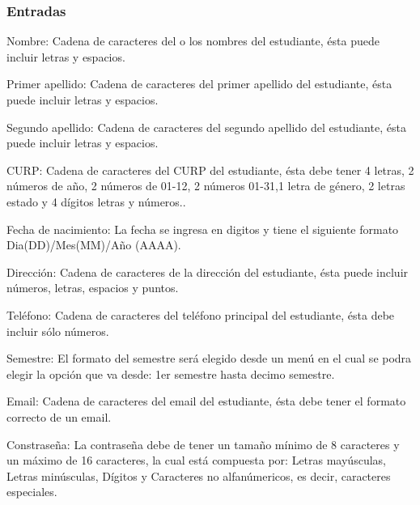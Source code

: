 \subsubsection{Entradas}
	\begin{Citemize}
		\item Nombre: Cadena de caracteres del o los nombres del estudiante, ésta puede incluir letras y espacios. 
		\item Primer apellido: Cadena de caracteres del primer apellido del estudiante, ésta puede incluir letras y espacios. 
		\item Segundo apellido: Cadena de caracteres del segundo apellido del estudiante, ésta puede incluir letras y espacios. 
		\item CURP: Cadena de caracteres del CURP del estudiante, ésta debe tener 4 letras, 2 números de año, 2 números de 01-12, 2 números 01-31,1 letra de género, 2 letras estado y 4 dígitos letras y números.. 
		\item Fecha de nacimiento: La fecha se ingresa en digitos y tiene el siguiente formato Dia(DD)/Mes(MM)/Año (AAAA).
		\item Dirección: Cadena de caracteres de la dirección del estudiante, ésta puede incluir números, letras, espacios y puntos. 
		\item Teléfono: Cadena de caracteres del teléfono principal del estudiante, ésta debe incluir sólo números. 
		\item Semestre: El formato del semestre será elegido desde un menú en el cual se podra elegir la opción que va desde: 1er semestre hasta decimo semestre.
		\item Email: Cadena de caracteres del email del estudiante, ésta debe tener el formato correcto de un email. 
		\item Constraseña: La contraseña debe de tener un tamaño mínimo de 8 caracteres y un máximo de 16 caracteres, la cual está compuesta por: Letras mayúsculas, Letras minúsculas, Dígitos y Caracteres no alfanúmericos, es decir, caracteres especiales.
	\end{Citemize}
